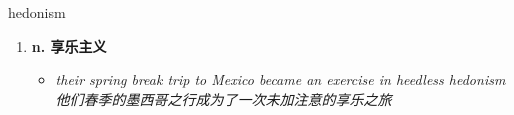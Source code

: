 
\begin{frame}
{\huge hedonism}
\begin{center}
\begin{enumerate}\Large
  \item \textbf{n. 享乐主义}
  \begin{itemize}
    \item \em{\Large{their spring break trip to Mexico became an exercise in heedless hedonism 他们春季的墨西哥之行成为了一次未加注意的享乐之旅}}
  \end{itemize}
\end{enumerate}
\end{center}
\end{frame}
